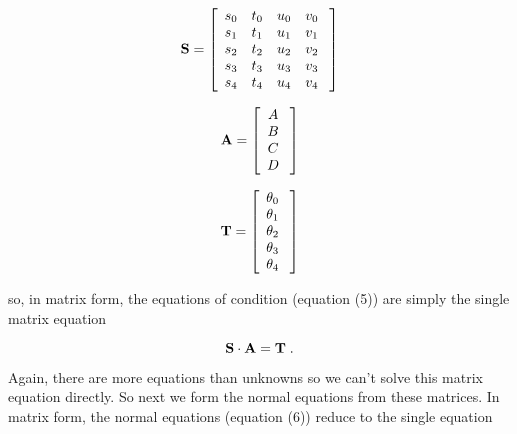 \begin{mathletters}
\label{satmatrices} 
\begin{eqnarray} 
{\bf S} = \left[
\begin{array}{cccc} 
{s_0} & {t_0} & {u_0} & {v_0} \\ 
{s_1} & {t_1} & {u_1} & {v_1} \\ 
{s_2} & {t_2} & {u_2} & {v_2} \\ 
{s_3} & {t_3} & {u_3} & {v_3} \\
{s_4} & {t_4} & {u_4} & {v_4} \\
\end{array} 
\; \right] 
\end{eqnarray}

\begin{eqnarray}
{\bf A} = \left[
\begin{array}{c}
A \\
B \\
C \\
D \\
\end{array} \; \right] 
\end{eqnarray}

\begin{eqnarray}
{\bf T} = \left[
\begin{array}{c} 
{\theta_0} \\ 
{\theta_1} \\ 
{\theta_2} \\ 
{\theta_3} \\ 
{\theta_4} \\ 
\end{array} 
\; \right]
\end{eqnarray} 
\end{mathletters} 

\noindent so, in matrix form, the equations of condition (equation (5))
are simply the single matrix equation

\begin{equation}
\label{equationofcondition}
{\bf S \cdot A} = {\bf T} \; .
\end{equation}

	Again, there are more equations than unknowns so we can't solve
this matrix equation directly.  So next we form the normal equations
from these matrices.  In matrix form, the normal equations (equation
(6)) reduce to the single equation 

